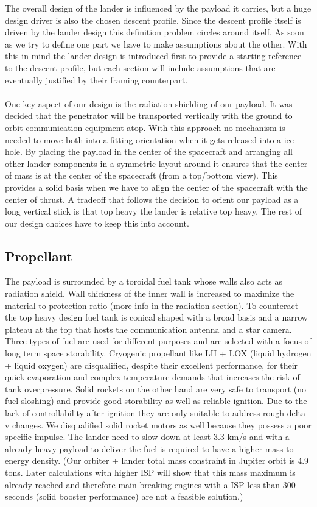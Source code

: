 \label{sec:Descent_Vehicle_Overall_Architecture}
The overall design of the lander is influenced by the payload it carries, but a huge design driver is also the chosen descent profile. Since the descent profile itself is driven by the lander design this definition problem circles around itself. As soon as we try to define one part we have to make assumptions about the other. With this in mind the lander design is introduced first to provide a starting reference to the descent profile, but each section will include assumptions that are eventually justified by their framing counterpart.\\
\\
One key aspect of our design is the radiation shielding of our payload. It was decided that the penetrator will be transported vertically with the ground to orbit communication equipment atop. With this approach no mechanism is needed to move both into a fitting orientation when it gets released into a ice hole. By placing the payload in the center of the spacecraft and arranging all other lander components in a symmetric layout around it ensures that the center of mass is at the center of the spacecraft (from a top/bottom view). This provides a solid basis when we have to align the center of the spacecraft with the center of thrust. A tradeoff that follows the decision to orient our payload as a long vertical stick is that top heavy the lander is relative top heavy. The rest of our design choices have to keep this into account.

\subsection{Propellant}
The payload is surrounded by a toroidal fuel tank whose walls also acts as radiation shield. Wall thickness of the inner wall is increased to maximize the material to protection ratio (more info in the radiation section). To counteract the top heavy design fuel tank is conical shaped with a broad basis and a narrow plateau at the top that hosts the communication antenna and a star camera. 
Three types of fuel are used for different purposes and are selected with a focus of long term space storability. Cryogenic propellant like LH + LOX (liquid hydrogen + liquid oxygen) are disqualified, despite their excellent performance, for their quick evaporation and complex temperature demands that increases the risk of tank overpressure. Solid rockets on the other hand are very safe to transport (no fuel sloshing) and provide good storability as well as reliable ignition. Due to the lack of controllability after ignition they are only suitable to address rough delta v changes. We disqualified solid rocket motors as well because they possess a poor specific impulse. The lander need to slow down at least 3.3 km/s  and with a already heavy payload to deliver the fuel is required to have a higher mass to energy density. (Our orbiter + lander total mass constraint in Jupiter orbit is 4.9 tons. Later calculations with higher ISP will show that this mass maximum is already reached and therefore main breaking engines with a ISP less than 300 seconds (solid booster performance) are not a feasible solution.)

